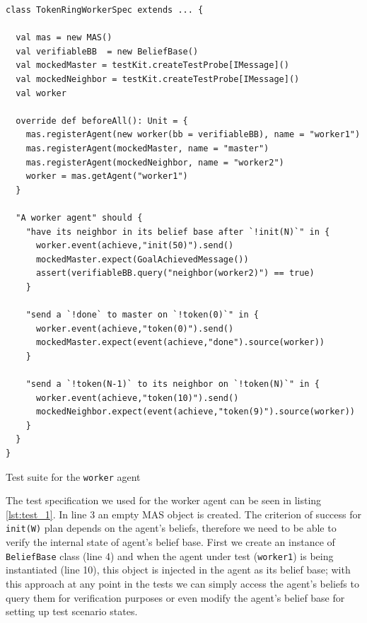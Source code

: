 \begin{listing}[!tb]
\centering
\begin{tcolorbox}[left=2pt,right=2pt,top=2pt,bottom=2pt,arc=0pt,
                  boxrule=0pt,toprule=1pt,
                  colback=white]
\begin{verbatim}
class TokenRingWorkerSpec extends ... {

  val mas = new MAS()
  val verifiableBB  = new BeliefBase()
  val mockedMaster = testKit.createTestProbe[IMessage]()
  val mockedNeighbor = testKit.createTestProbe[IMessage]()
  val worker

  override def beforeAll(): Unit = {
    mas.registerAgent(new worker(bb = verifiableBB), name = "worker1")
    mas.registerAgent(mockedMaster, name = "master")
    mas.registerAgent(mockedNeighbor, name = "worker2")
    worker = mas.getAgent("worker1")
  }

  "A worker agent" should {
    "have its neighbor in its belief base after `!init(N)`" in {
      worker.event(achieve,"init(50)").send()
      mockedMaster.expect(GoalAchievedMessage())
      assert(verifiableBB.query("neighbor(worker2)") == true)
    }

    "send a `!done` to master on `!token(0)`" in {
      worker.event(achieve,"token(0)").send()
      mockedMaster.expect(event(achieve,"done").source(worker))
    }

    "send a `!token(N-1)` to its neighbor on `!token(N)`" in {
      worker.event(achieve,"token(10)").send()
      mockedNeighbor.expect(event(achieve,"token(9)").source(worker))
    }
  }
}
\end{verbatim}
\end{tcolorbox}
    \caption{Test suite for the \texttt{worker} agent}
    \label{lst:test_1}
\end{listing}

The test specification we used for the worker agent can be seen in listing \ref{lst:test_1}. In line 3 an empty MAS object is created. The criterion of success for \texttt{init(W)} plan depends on the agent's beliefs, therefore we need to be able to verify the internal state of agent's belief base. First we create an instance of \texttt{BeliefBase} class (line 4) and when the agent under test (\texttt{worker1}) is being instantiated (line 10), this object is injected in the agent as its belief base; with this approach at any point in the tests we can simply access the agent's beliefs to query them for verification purposes or even modify the agent's belief base for setting up test scenario states.

